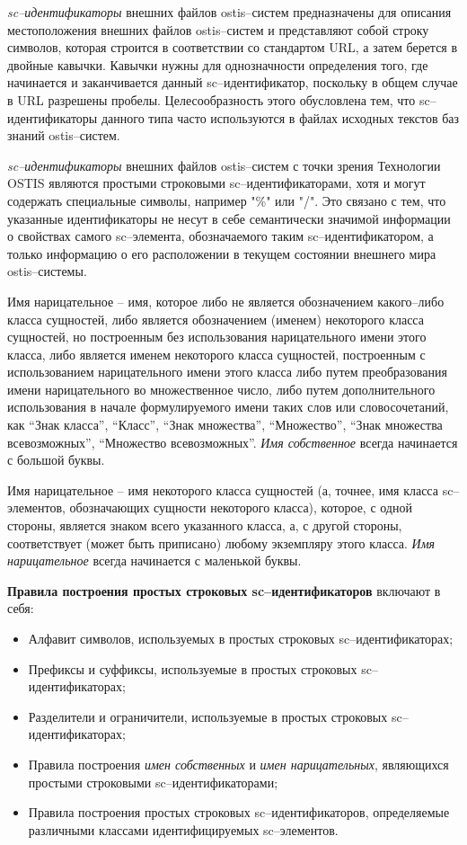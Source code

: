 \textit{sc--идентификаторы} внешних файлов ostis--систем предназначены для описания местоположения внешних файлов ostis--систем и представляют собой строку символов, которая строится в соответствии со стандартом URL, а затем берется в двойные кавычки. Кавычки нужны для однозначности определения того, где начинается и заканчивается данный sc--идентификатор, поскольку в общем случае в URL разрешены пробелы. Целесообразность этого обусловлена тем, что sc--идентификаторы данного типа часто используются в файлах исходных текстов баз знаний ostis--систем.

\textit{sc--идентификаторы} внешних файлов ostis--систем с точки зрения Технологии OSTIS являются простыми строковыми sc--идентификаторами, хотя и могут содержать специальные символы, например "\%"{} или "/"{}. Это связано с тем, что указанные идентификаторы не несут в себе семантически значимой информации о свойствах самого sc--элемента, обозначаемого таким sc--идентификатором, а только информацию о его расположении в текущем состоянии внешнего мира ostis--системы.


Имя нарицательное -- имя, которое либо не является обозначением какого--либо класса сущностей, либо является обозначением (именем) некоторого класса сущностей, но построенным без использования нарицательного имени этого класса, либо является именем некоторого класса сущностей, построенным с использованием нарицательного имени этого класса либо путем преобразования имени нарицательного во множественное число, либо путем дополнительного использования в начале формулируемого имени таких слов или словосочетаний, как ``Знак класса'', ``Класс'', ``Знак множества'', ``Множество'', ``Знак множества всевозможных'', ``Множество всевозможных''. \textit{Имя собственное} всегда начинается с большой буквы.

Имя нарицательное -- имя некоторого класса сущностей (а, точнее, имя класса sc--элементов, обозначающих сущности некоторого класса), которое, с одной стороны, является знаком всего указанного класса, а, с другой стороны, соответствует (может быть приписано) любому экземпляру этого класса. \textit{Имя нарицательное} всегда начинается с маленькой буквы.

\textbf{Правила построения простых строковых sc--идентификаторов} включают в себя:
\begin{itemize}
	\item Алфавит символов, используемых в простых строковых sc--идентификаторах;
	\item Префиксы и суффиксы, используемые в простых строковых sc--идентификаторах;
	\item Разделители и ограничители, используемые в простых строковых sc--идентификаторах;
	\item Правила построения \textit{имен собственных} и \textit{имен нарицательных}, являющихся простыми строковыми sc--идентификаторами;
	\item Правила построения простых строковых sc--идентификаторов, определяемые различными классами идентифицируемых sc--элементов.
\end{itemize}

